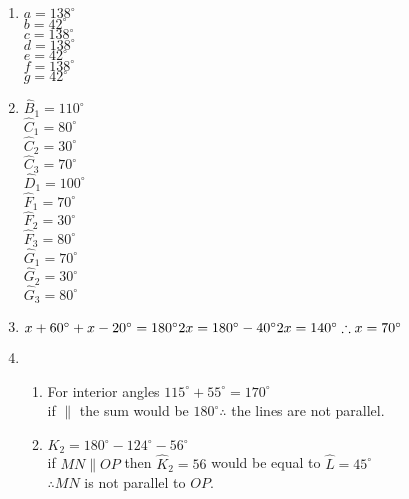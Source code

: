 \begin{solutions}{}{
\begin{enumerate}[itemsep=5pt, label=\textbf{\arabic*}. ] 


\item \begin{multicols}{2} %
    $a=138^{\circ}$\\ $b=42^{\circ}$\\ $c=138^{\circ}$\\ $d=138^{\circ}$\\ $e=42^{\circ}$\\ $f=138^{\circ}$\\ $g=42^{\circ}$
\end{multicols}
\item \begin{multicols}{2}%
 $\hat{B}_1=110^{\circ}$\\ $\hat{C}_1=80^{\circ}$\\ $\hat{C}_2=30^{\circ}$\\ $\hat{C}_3=70^{\circ}$\\ $\hat{D}_1=100^{\circ}$\\ $\hat{F}_1=70^{\circ}$\\ $\hat{F}_2=30^{\circ}$\\ $\hat{F}_3=80^{\circ}$\\ $\hat{G}_1=70^{\circ}$\\ $\hat{G}_2=30^{\circ}$\\ $\hat{G}_3=80^{\circ}$
\end{multicols}
\item %
$x + 60^\circ + x - 20^\circ = 180^\circ\\
2x = 180^\circ - 40^\circ\\
2x = 140^\circ\\
\therefore x = 70^\circ$

\item %
\begin{enumerate}[itemsep=3pt, label=\textbf{(\alph*)} ]
\item For interior angles $115^\circ + 55^\circ = 170^\circ$\\
if $\parallel$ the sum would be $180^\circ \therefore$ the lines are not parallel.

\item $K_2 = 180^{\circ} - 124^\circ  - 56^\circ$\\
if $MN \parallel OP$ then $\hat{K}_2 = 56$ would be equal to $\hat{L} = 45^\circ$\\
$\therefore MN$ is not parallel to $OP$.


\end{enumerate}
\end{enumerate}}
\end{solutions}
